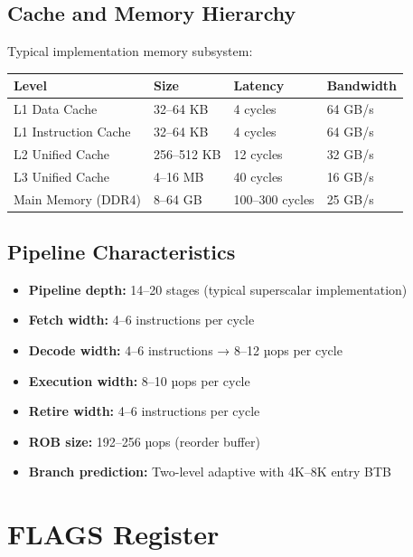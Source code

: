\documentclass[12pt]{article}
\begin{document}
\subsection{Cache and Memory Hierarchy}

Typical implementation memory subsystem:

\begin{table}[h]
\centering
\begin{tabular}{@{}llll@{}}
\toprule
\textbf{Level} & \textbf{Size} & \textbf{Latency} & \textbf{Bandwidth} \\ \midrule
L1 Data Cache & 32--64 KB & 4 cycles & 64 GB/s \\
L1 Instruction Cache & 32--64 KB & 4 cycles & 64 GB/s \\
L2 Unified Cache & 256--512 KB & 12 cycles & 32 GB/s \\
L3 Unified Cache & 4--16 MB & 40 cycles & 16 GB/s \\
Main Memory (DDR4) & 8--64 GB & 100--300 cycles & 25 GB/s \\ \bottomrule
\end{tabular}
\end{table}

\subsection{Pipeline Characteristics}

\begin{itemize}
    \item \textbf{Pipeline depth:} 14--20 stages (typical superscalar implementation)
    \item \textbf{Fetch width:} 4--6 instructions per cycle
    \item \textbf{Decode width:} 4--6 instructions → 8--12 µops per cycle
    \item \textbf{Execution width:} 8--10 µops per cycle
    \item \textbf{Retire width:} 4--6 instructions per cycle
    \item \textbf{ROB size:} 192--256 µops (reorder buffer)
    \item \textbf{Branch prediction:} Two-level adaptive with 4K--8K entry BTB
\end{itemize}

\section{FLAGS Register}
\end{document}
